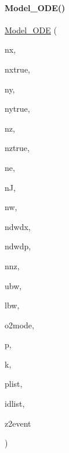 \paragraph{\texorpdfstring{Model\+\_\+\+O\+D\+E()}{Model\_ODE()}\hspace{0.1cm}{\footnotesize\ttfamily [2/3]}}
{\footnotesize\ttfamily \mbox{\hyperlink{classamici_1_1_model___o_d_e}{Model\+\_\+\+O\+DE}} (\begin{DoxyParamCaption}\item[{const int}]{nx,  }\item[{const int}]{nxtrue,  }\item[{const int}]{ny,  }\item[{const int}]{nytrue,  }\item[{const int}]{nz,  }\item[{const int}]{nztrue,  }\item[{const int}]{ne,  }\item[{const int}]{nJ,  }\item[{const int}]{nw,  }\item[{const int}]{ndwdx,  }\item[{const int}]{ndwdp,  }\item[{const int}]{nnz,  }\item[{const int}]{ubw,  }\item[{const int}]{lbw,  }\item[{const \mbox{\hyperlink{namespaceamici_a2d77779286167d5603a870bf9f6c21ba}{Second\+Order\+Mode}}}]{o2mode,  }\item[{const std\+::vector$<$ \mbox{\hyperlink{namespaceamici_a1bdce28051d6a53868f7ccbf5f2c14a3}{realtype}} $>$}]{p,  }\item[{const std\+::vector$<$ \mbox{\hyperlink{namespaceamici_a1bdce28051d6a53868f7ccbf5f2c14a3}{realtype}} $>$}]{k,  }\item[{const std\+::vector$<$ int $>$}]{plist,  }\item[{const std\+::vector$<$ \mbox{\hyperlink{namespaceamici_a1bdce28051d6a53868f7ccbf5f2c14a3}{realtype}} $>$}]{idlist,  }\item[{const std\+::vector$<$ int $>$}]{z2event }\end{DoxyParamCaption})}

